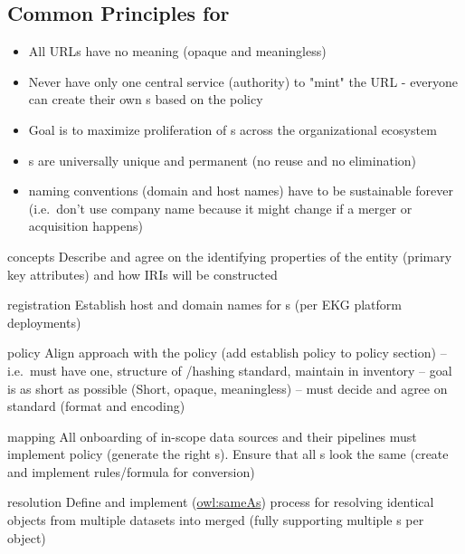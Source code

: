 \subsection*{Common Principles for }

\begin{itemize}
  \item All URLs have no meaning (opaque and meaningless)
  \item Never have only one central service (authority) to "mint" the URL - everyone can create their own
        s based on the policy
  \item Goal is to maximize proliferation of s across the organizational ecosystem
  \item {}s are universally unique and permanent (no reuse and no elimination)
  \item {} naming conventions (domain and host names) have to be sustainable forever
        (i.e.\ don't use company name because it might change if a merger or acquisition happens)
\end{itemize}

\kgmmscoringsection

\kgmmscoringlevelOne

\begin{scoring}

  \item [concepts] Describe and agree on the identifying properties of the entity (primary key
        attributes) and how IRIs will be constructed
  \item [registration] Establish host and domain names for s (per EKG platform deployments)
  \item [policy] Align approach with the  policy (add establish policy to policy section) --
        i.e.\ must have one, structure of /hashing standard, maintain in inventory --
        goal is as short as possible (Short, opaque, meaningless) --
        must decide and agree on standard (format and encoding)
  \item [mapping] All onboarding of in-scope data sources and their  pipelines must implement policy
        (generate the right s).
        Ensure that all s look the same (create and implement rules/formula for conversion)
  \item [resolution] Define and implement (\href{https://www.w3.org/TR/owl-ref/\#sameAs-def}{owl:sameAs}) process for
        resolving identical objects from multiple datasets into merged  (fully supporting
        multiple s per object)

\end{scoring}

